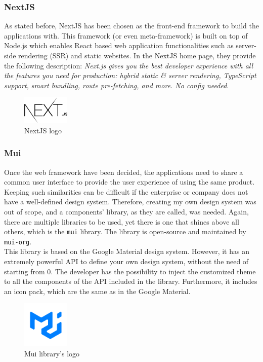 \documentclass[a4paper, 12pt, oneside]{book}
\begin{document}
\subsubsection{NextJS}
As stated before, NextJS has been chosen as the front-end framework to build the applications with. This framework (or even meta-framework) is built on top of Node.js which enables React based web application functionalities such as server-side rendering (SSR) and static websites. In the NextJS home page, they provide the following description: \emph{Next.js gives you the best developer experience with all the features you need for production: hybrid static \& server rendering, TypeScript support, smart bundling, route pre-fetching, and more. No config needed}.
\\
\begin{figure}[h!]
	\centering
	\includegraphics[width=0.2\textwidth]{assets/next-logo.png}
	\caption{NextJS logo}
\end{figure}
\subsubsection{Mui}
Once the web framework have been decided, the applications need to share a common user interface to provide the user experience of using the same product. Keeping such similarities can be difficult if the enterprise or company does not have a well-defined design system. Therefore, creating my own design system was out of scope, and a components' library, as they are called, was needed. Again, there are multiple libraries to be used, yet there is one that shines above all others, which is the \texttt{mui} library. The library is open-source and maintained by \texttt{mui-org}.
\\[8pt]
This library is based on the Google Material design system. However, it has an extremely powerful API to define your own design system, without the need of starting from 0. The developer has the possibility to inject the customized theme to all the components of the API included in the library. Furthermore, it includes an icon pack, which are the same as in the Google Material.
\\
\begin{figure}[h!]
	\centering
	\includegraphics[width=0.2\textwidth]{assets/mui-logo.png}
	\caption{Mui library's logo}
\end{figure}
\end{document}
